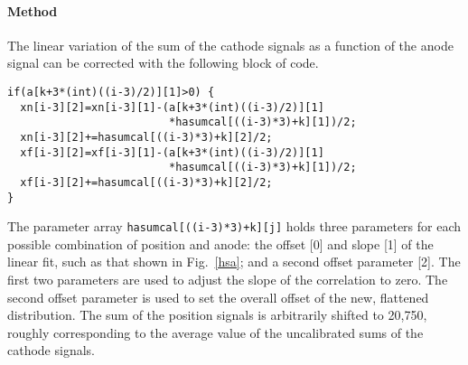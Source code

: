 \paragraph{Method}
The linear variation of the sum of the cathode signals as a function of the anode signal can be corrected with the following block of code.
\vspace{0.5\baselineskip}
\par\noindent
\begin{minipage}{\linewidth}
  \singlespace
\begin{lstlisting}[caption={Here the index \texttt{i} runs over 3--6, corresponding to the cathode signal pairs and \texttt{k} runs over 0--2, corresponding to the anode signal; as defined in Tables~\ref{TDC_signals} and \ref{position-andode}. The expression \texttt{(int)((i-3)/2)} has a value of 0 or 1 and selects the detector number. The expression \texttt{k+3*(int)((i-3)/2)} has a value of 0--5 
%1 or 4 
and selects the anode signal. See the text for further details.
},label=anode-cathode-eq]
if(a[k+3*(int)((i-3)/2)][1]>0) {
  xn[i-3][2]=xn[i-3][1]-(a[k+3*(int)((i-3)/2)][1]
                         *hasumcal[((i-3)*3)+k][1])/2;
  xn[i-3][2]+=hasumcal[((i-3)*3)+k][2]/2;
  xf[i-3][2]=xf[i-3][1]-(a[k+3*(int)((i-3)/2)][1]
                         *hasumcal[((i-3)*3)+k][1])/2;
  xf[i-3][2]+=hasumcal[((i-3)*3)+k][2]/2;
}
\end{lstlisting}
\end{minipage}
\begin{sloppypar}

The parameter array \texttt{hasumcal[((i-3)*3)+k][j]} holds three parameters for each possible combination of position and anode: the offset [0] and slope [1] of the linear fit, such as that  shown in Fig.~\ref{hsa}; and a second offset parameter [2].  The first two parameters are used to adjust the slope of the correlation to zero.  The second offset parameter is used to set the overall offset of the new, flattened distribution.  The sum of the position signals is arbitrarily shifted to 20,750, roughly corresponding to the average value of the uncalibrated sums of the cathode signals.  

\end{sloppypar}
